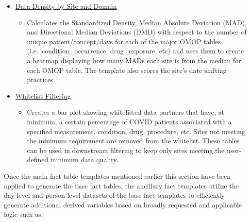 \documentclass[
  letterpaper,
  DIV=11,
  numbers=noendperiod]{scrreprt}
\providecommand{\tightlist}{%
  \setlength{\itemsep}{0pt}\setlength{\parskip}{0pt}}\usepackage{longtable,booktabs,array}
\begin{document}
\begin{itemize}
\tightlist
\item
  \href{https://unite.nih.gov/workspace/module/view/latest/ri.workshop.main.module.3ab34203-d7f3-482e-adbd-f4113bfd1a2b?id=KO-C3B0BBE\&view=focus}{Data
  Density by Site and Domain}

  \begin{itemize}
  \tightlist
  \item
    Calculates the Standardized Density, Median Absolute Deviation
    (MAD), and Directional Median Deviations (DMD) with respect to the
    number of unique patient/concept/days for each of the major OMOP
    tables (i.e.~condition\_occurrence, drug\_exposure, etc) and uses
    them to create a heatmap displaying how many MADs each site is from
    the median for each OMOP table. The template also scores the site's
    date shifting practices.
  \end{itemize}
\item
  \href{https://unite.nih.gov/workspace/module/view/latest/ri.workshop.main.module.3ab34203-d7f3-482e-adbd-f4113bfd1a2b?id=KO-D00A6DC\&view=focus}{Whitelist
  Filtering}

  \begin{itemize}
  \tightlist
  \item
    Creates a bar plot showing whitelisted data partners that have, at
    minimum, a certain percentage of COVID patients associated with a
    specified measurement, condition, drug, procedure, etc. Sites not
    meeting the minimum requirement are removed from the whitelist.
    These tables can be used in downstream filtering to keep only sites
    meeting the user-defined minimum data quality.
  \end{itemize}
\end{itemize}

Once the main fact table templates mentioned earlier this section have
been applied to generate the base fact tables, the ancillary fact
templates utilize the day-level and person-level datasets of the base
fact templates to efficiently generate additional derived variables
based on broadly requested and applicable logic such as:
\end{document}
